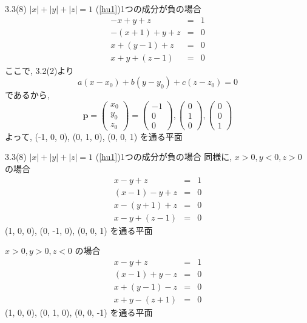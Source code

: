 \documentclass{beamer}
\begin{document}
\begin{frame}{3.3(8) $|x| + |y| + |z|  = 1$ \hspace{5mm} (\ref{hu1})1つの成分が負の場合}
  \begin{eqnarray*}
    -x + y + z &=& 1\\
    -(x+1) + y + z &=& 0\\
    x + (y-1) + z &=& 0\\
    x + y + (z-1) &=& 0
  \end{eqnarray*}
  ここで, 3.2(2)より
  \begin{equation*}
    a(x-x_0) + b(y-y_0) + c(z-z_0) = 0
  \end{equation*}
  であるから,
  \begin{equation*}
    \bm{p} = 
    \begin{pmatrix}
      x_0\\
      y_0\\
      z_0
    \end{pmatrix} =
    \begin{pmatrix}
      -1\\
      0\\
      0
    \end{pmatrix} , 
    \begin{pmatrix}
      0\\
      1\\
      0
    \end{pmatrix} , 
    \begin{pmatrix}
      0\\
      0\\
      1
    \end{pmatrix} 
  \end{equation*}
  よって, (-1, 0, 0), (0, 1, 0), (0, 0, 1) を通る平面
\end{frame}



\begin{frame}{3.3(8) $|x| + |y| + |z|  = 1$ \hspace{5mm} (\ref{hu1})1つの成分が負の場合}
  同様に, $x > 0, y < 0, z > 0$ の場合 
  \begin{eqnarray*}
    x - y + z &=& 1\\
    (x-1) - y + z &=& 0\\
    x - (y+1) + z &=& 0\\
    x - y + (z-1) &=& 0
  \end{eqnarray*}
  (1, 0, 0), (0, -1, 0), (0, 0, 1) を通る平面 \\ \vspace{5mm}

  $x > 0, y > 0, z < 0$ の場合 
  \begin{eqnarray*}
    x - y + z &=& 1\\
    (x-1) + y - z &=& 0\\
    x + (y-1) - z &=& 0\\
    x + y - (z+1) &=& 0
  \end{eqnarray*}
  (1, 0, 0), (0, 1, 0), (0, 0, -1) を通る平面
\end{frame}
\end{document}
